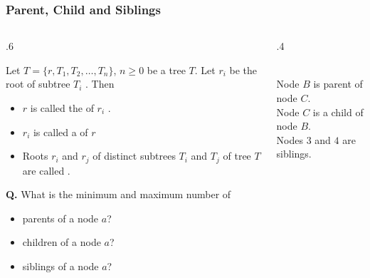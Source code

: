 \documentclass[10pt]{beamer}
\begin{document}
\begin{frame}[t]\frametitle{Parent, Child and Siblings}
	\begin{columns}[T] %
	\begin{column}{.6\linewidth} %
	{\footnotesize 
		\begin{definition}
			Let $T = \{r, T_{1}, T_{2}, \ldots, T_{n}\}$, $n \ge 0$ be a tree $T$.					    
			Let  $r_{i}$ be the root of subtree  $T_{i}$ .
			Then 
			\begin{itemize}
				
				\item
				 $r$ is called the  of $r_{i}$ .
	
				\item 
				$r_{i}$ is called a  of $r$
				 
				 \item
				 Roots $r_{i}$ and $r_{j}$ of distinct subtrees $T_{i}$ 
				 and $T_{j}$ of tree $T$ are called .
			\end{itemize}
		\end{definition}	
		\textbf{Q.}
		What is the minimum and maximum number of 
		\begin{itemize}
			
			\item 
			parents of a node $a$?
			
			\item 
			children of a node $a$?
			
			\item 
			siblings of a node $a$?
			
		\end{itemize}
	} %
	\end{column} %
	\begin{column}{.4\linewidth} %
		\begin{example}
		{\scriptsize
			
			\\
			Node $B$ is parent of node $C$.\\
			Node $C$ is a child of node $B$.\\
			Nodes $3$ and $4$ are siblings.\\
		} %
		\end{example}
	\end{column} %
	\end{columns} %
\end{frame}
\end{document}
